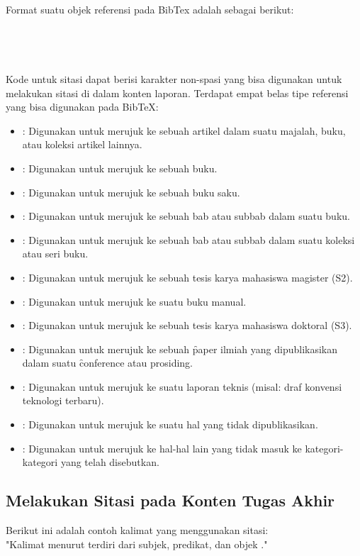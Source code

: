 Format suatu objek referensi pada BibTex adalah sebagai berikut: \\
\\
\\
\\
\code{\}}\\
Kode untuk sitasi dapat berisi karakter non-spasi yang bisa digunakan untuk melakukan sitasi di dalam konten laporan. Terdapat empat belas tipe referensi yang bisa digunakan pada BibTeX:
\begin{itemize}
	\item {}: Digunakan untuk merujuk ke sebuah artikel dalam suatu majalah, buku, atau koleksi artikel lainnya.
	\item {}: Digunakan untuk merujuk ke sebuah buku.
	\item {}: Digunakan untuk merujuk ke sebuah buku saku.
	\item {}: Digunakan untuk merujuk ke sebuah bab atau subbab dalam suatu buku.
	\item {}: Digunakan untuk merujuk ke sebuah bab atau subbab dalam suatu koleksi atau seri buku.
	\item {}: Digunakan untuk merujuk ke sebuah tesis karya mahasiswa magister (S2).
	\item {}: Digunakan untuk merujuk ke suatu buku manual.
	\item {}: Digunakan untuk merujuk ke sebuah tesis karya mahasiswa doktoral (S3).
	\item {}: Digunakan untuk merujuk ke sebuah \f{paper} ilmiah yang dipublikasikan dalam suatu \f{conference} atau prosiding.
	\item {}: Digunakan untuk merujuk ke suatu laporan teknis (misal: draf konvensi teknologi terbaru).
	\item {}: Digunakan untuk merujuk ke suatu hal yang tidak dipublikasikan.
	\item {}: Digunakan untuk merujuk ke hal-hal lain yang tidak masuk ke kategori-kategori yang telah disebutkan.
\end{itemize}

\subsection{Melakukan Sitasi pada Konten Tugas Akhir}
\label{sec:bibtexAddCite}
Berikut ini adalah contoh kalimat yang menggunakan sitasi: \\
"Kalimat menurut \cite{book:sample} terdiri dari subjek, predikat, dan objek \citep{book:sample}."

